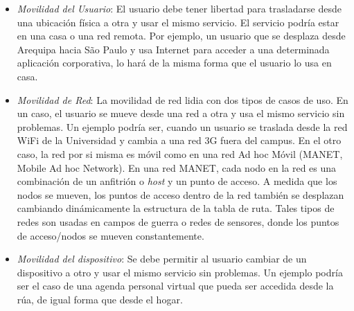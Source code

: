 \begin{itemize}
 \item \textit{Movilidad del Usuario}: El usuario debe tener libertad para trasladarse desde una ubicación física a otra y usar el mismo servicio.
 El servicio podría estar en una casa o una red remota. Por ejemplo, un usuario que se desplaza desde Arequipa hacia São Paulo y usa Internet 
 para acceder a una determinada aplicación corporativa, lo hará de la misma forma que el usuario lo usa en casa. 
 \item \textit{Movilidad de Red}: La movilidad de red lidia con dos tipos de casos de uso. En un caso, el usuario se mueve desde una red a otra y usa
 el mismo servicio sin problemas. Un ejemplo podría ser, cuando un usuario se traslada desde la red WiFi de la Universidad y cambia a una red 3G
 fuera del campus. En el otro caso, la red por si misma es móvil como en una red Ad hoc Móvil (MANET, Mobile Ad hoc Network). En una red MANET, cada 
 nodo en la red es una combinación de un anfitrión o \textit{host} y un punto de acceso. A medida que los nodos se mueven, los puntos de acceso 
 dentro de la red también se desplazan cambiando dinámicamente la estructura de la tabla de ruta.  Tales tipos de redes son usadas en campos 
 de guerra o redes de sensores, donde los puntos de acceso/nodos se mueven constantemente.
 \item \textit{Movilidad del dispositivo}: Se debe permitir al usuario cambiar de un dispositivo a otro y usar el mismo servicio sin problemas.
 Un ejemplo podría ser el caso de una agenda personal virtual que pueda ser accedida desde la rúa, de igual forma que desde el hogar.
\end{itemize}




